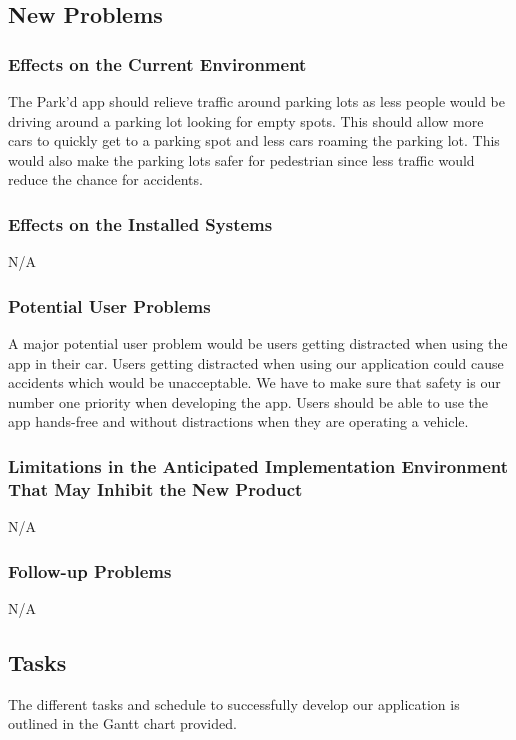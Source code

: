 \documentclass[12pt,letterpaper]{article}
\begin{document}
\subsection{New Problems}
\subsubsection{Effects on the Current Environment}
The Park'd app should relieve traffic around parking lots as less people would be driving around a parking lot looking for empty spots. This should allow more cars to quickly get to a parking spot and less cars roaming the parking lot. This would also make the parking lots safer for pedestrian since less traffic would reduce the chance for accidents.

\subsubsection{Effects on the Installed Systems}
N/A

\subsubsection{Potential User Problems}
A major potential user problem would be users getting distracted when using the app in their car. Users getting distracted when using our application could cause accidents which would be unacceptable. We have to make sure that safety is our number one priority when developing the app. Users should be able to use the app hands-free and without distractions when they are operating a vehicle.

\subsubsection{Limitations in the Anticipated Implementation Environment That May Inhibit the New Product}

N/A

\subsubsection{Follow-up Problems}

N/A

\subsection{Tasks}
\label{subsec:Tasks}
The different tasks and schedule to successfully develop our application is outlined in the Gantt chart provided.
\end{document}
